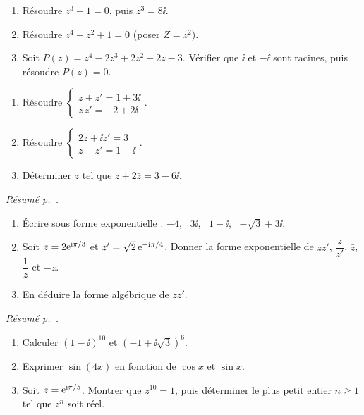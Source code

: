 \begin{enumerate}
	\item Résoudre $z^3 - 1 = 0$, puis $z^3 = 8\ii$.
	\item Résoudre $z^4 + z^2 + 1 = 0$ (poser $Z = z^2$).
	\item Soit $P(z) = z^4 - 2z^3 + 2z^2 + 2z - 3$. Vérifier que $\ii$ et
	$-\ii$ sont racines, puis résoudre $P(z) = 0$.
\end{enumerate}

\begin{enumerate}
	\item Résoudre $\begin{cases} z + z' = 1 + 3\ii \\ z\,z' = -2 + 2\ii \end{cases}$.
	\item Résoudre $\begin{cases} 2z + \ii z' = 3 \\ z - z' = 1 - \ii \end{cases}$.
	\item Déterminer $z$ tel que $z + 2\bar z = 3 - 6\ii$.
\end{enumerate}

\emph{Résumé p.~\pageref{res:cplx_expo}.}
\begin{enumerate}
	\item Écrire sous forme exponentielle : $-4$, \ $3\ii$, \ $1 - \ii$, \
	$-\sqrt3 + 3\ii$.
	\item Soit $z = 2\mathrm{e}^{\mathrm{i}\pi/3}$ et $z' = \sqrt2\,\mathrm{e}^{-\mathrm{i}\pi/4}$.
	Donner la forme exponentielle de $zz'$, $\dfrac{z}{z'}$, $\bar z$,
	$\dfrac{1}{z}$ et $-z$.
	\item En déduire la forme algébrique de $zz'$.
\end{enumerate}

\emph{Résumé p.~\pageref{res:cplx_moivre}.}
\begin{enumerate}
	\item Calculer $(1 - \ii)^{10}$ et $\left(-1 + \ii\sqrt3\right)^{6}$.
	\item Exprimer $\sin(4x)$ en fonction de $\cos x$ et $\sin x$.
	\item Soit $z = \mathrm{e}^{\mathrm{i}\pi/5}$. Montrer que $z^{10} = 1$, puis déterminer
	le plus petit entier $n \geq 1$ tel que $z^n$ soit réel.
\end{enumerate}

